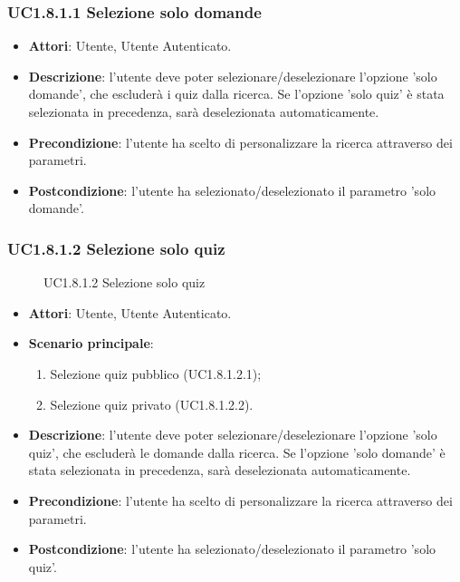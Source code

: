 \subsubsection{UC1.8.1.1 Selezione solo domande}
\begin{itemize}
\item \textbf{Attori}: Utente, Utente Autenticato.
\item \textbf{Descrizione}: l'utente deve poter selezionare/deselezionare l'opzione 'solo domande', che escluderà i quiz dalla ricerca. Se l'opzione 'solo quiz' è stata selezionata in precedenza, sarà deselezionata automaticamente.
\item \textbf{Precondizione}: l'utente ha scelto di personalizzare la ricerca attraverso dei parametri.
\item \textbf{Postcondizione}: l'utente ha selezionato/deselezionato il parametro 'solo domande'.
\end{itemize}
\subsubsection{UC1.8.1.2 Selezione solo quiz}
\begin{figure}[H]
\centering
\noindent{}
\caption{UC1.8.1.2 Selezione solo quiz}
\end{figure}
\begin{itemize}
\item \textbf{Attori}: Utente, Utente Autenticato.
\item \textbf{Scenario principale}:
\begin{enumerate}
\item Selezione quiz pubblico (UC1.8.1.2.1);
\item Selezione quiz privato (UC1.8.1.2.2).
\end{enumerate}
\item \textbf{Descrizione}: l'utente deve poter selezionare/deselezionare l'opzione 'solo quiz', che escluderà le domande dalla ricerca. Se l'opzione 'solo domande' è stata selezionata in precedenza, sarà deselezionata automaticamente.
\item \textbf{Precondizione}: l'utente ha scelto di personalizzare la ricerca attraverso dei parametri.
\item \textbf{Postcondizione}: l'utente ha selezionato/deselezionato il parametro 'solo quiz'.
\end{itemize}
